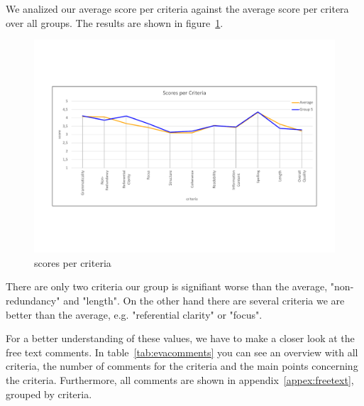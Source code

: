 We analized our average score per criteria against the average score per critera over all groups. The results are shown in figure~\ref{fig:spc}.

\begin{figure}[H]
	\centering
	\includegraphics[trim=0 150 0 150, width=\textwidth]{img/scores_per_criteria.pdf}
	\caption{scores per criteria}
	\label{fig:spc}
\end{figure}

There are only two criteria our group is signifiant worse than the average, "non-redundancy" and "length". On the other hand there are several criteria we are better than the average, e.g. "referential clarity" or "focus".

For a better understanding of these values, we have to make a closer look at the free text comments.
In table~\ref{tab:evacomments} you can see an overview with all criteria, the number of comments for the criteria and the main points concerning the criteria. Furthermore, all comments are shown in appendix~\ref{appex:freetext}, grouped by criteria.

